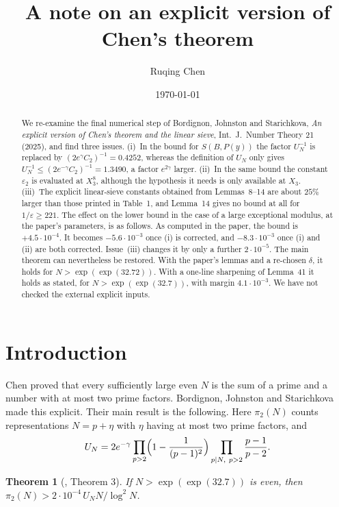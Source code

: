 \documentclass[11pt,a4paper]{amsart}
\title[An explicit version of Chen's theorem]{A note on an explicit version of Chen's theorem}
\author{Ruqing Chen}
\date{\today}
\newtheorem{theorem}{Theorem}
\theoremstyle{remark}
\newcommand{\eps}{\varepsilon}
\newcommand{\BJS}{\cite{BJS}}
\begin{document}
\begin{abstract}
We re-examine the final numerical step of Bordignon, Johnston and Starichkova, \emph{An explicit
version of Chen's theorem and the linear sieve}, Int.\ J.\ Number Theory 21 (2025), and find three issues.
(i)~In the bound for $S(B,P(y))$ the factor $U_N^{-1}$ is replaced by $(2e^{\gamma}C_2)^{-1}=0.4252$, whereas the
definition of $U_N$ only gives $U_N^{-1}\le(2e^{-\gamma}C_2)^{-1}=1.3490$, a factor $e^{2\gamma}$ larger.
(ii)~In the same bound the constant $\eps_2$ is evaluated at $X_3^8$, although the hypothesis it needs is only
available at $X_3$. (iii)~The explicit linear-sieve constants obtained from Lemmas~8--14 are about $25\%$ larger
than those printed in Table~1, and Lemma~14 gives no bound at all for $1/\eps\ge221$. The effect on the lower
bound in the case of a large exceptional modulus, at the paper's parameters, is as follows. As computed in the
paper, the bound is $+4.5\cdot10^{-4}$. It becomes $-5.6\cdot10^{-3}$ once (i) is corrected, and
$-8.3\cdot10^{-3}$ once (i) and (ii) are both corrected. Issue~(iii) changes it by only a further
$2\cdot10^{-5}$. The main theorem can nevertheless be restored. With the paper's lemmas and a re-chosen
$\delta$, it holds for $N>\exp(\exp(32.72))$. With a one-line sharpening of Lemma~41 it holds as stated, for
$N>\exp(\exp(32.7))$, with margin $4.1\cdot10^{-3}$. We have not checked the external explicit inputs.
\end{abstract}
\maketitle

\section{Introduction}

Chen \cite{Chen} proved that every sufficiently large even $N$ is the sum of a prime and a number with at most two
prime factors. Bordignon, Johnston and Starichkova \BJS{} made this explicit. Their main result is the following.
Here $\pi_2(N)$ counts representations $N=p+\eta$ with $\eta$ having at most two prime factors, and
\begin{equation}\label{eq:UN}
U_N=2e^{-\gamma}\prod_{p>2}\Bigl(1-\frac{1}{(p-1)^2}\Bigr)\prod_{p\mid N,\ p>2}\frac{p-1}{p-2}.
\end{equation}

\begin{theorem}[{\BJS, Theorem 3}]\label{thm:BJS}
If $N>\exp(\exp(32.7))$ is even, then $\pi_2(N)>2\cdot10^{-4}\,U_NN/\log^2N$.
\end{theorem}
\end{document}
